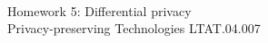 
\thispagestyle{empty}
\begin{center}

\large
{\thesisUniversity}\\
{\thesisInstitute}\\
{\thesisDepartment}\\

\vspace{45mm}

\Large {\thesisAuthor}

\vspace{4mm}
\large

\huge{Homework 5: Differential privacy} \\
\vspace{4mm}
\Large {Privacy-preserving Technologies LTAT.04.007}


\vspace{20mm}


\end{center}

\vspace{2mm}

\begin{flushright}
 {
 \setlength{\extrarowheight}{5pt}
 \begin{tabular}{r l} 
 \end{tabular}
 }
\end{flushright}


\vfill
\centerline{\large {\thesisCity} {\thesisYear}}

